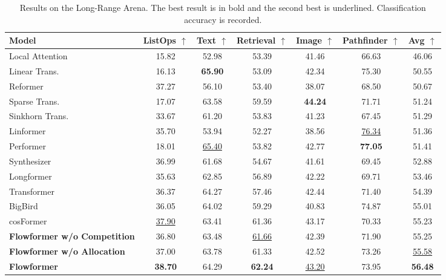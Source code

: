 \documentclass[nohyperref]{article}
\theoremstyle{plain}
\theoremstyle{definition}
\theoremstyle{remark}
\begin{document}
\begin{table*}[h]
	\caption{Results on the Long-Range Arena. The best result is in bold and the second best is underlined. Classification accuracy is recorded.}
	\label{tab:lra}
	\vspace{-5pt}
	\vskip 0.15in
	\centering
	\begin{small}
		\begin{sc}
			\renewcommand{\multirowsetup}{\centering}
			\setlength{\tabcolsep}{4.3pt}
			\begin{tabular}{l|ccccc|c}
				\toprule
				Model & ListOps $\uparrow$ & Text $\uparrow$ & Retrieval $\uparrow$ & Image $\uparrow$ & Pathfinder $\uparrow$ & Avg $\uparrow$ \\
				\midrule
				Local Attention \citep{tay2021long} & 15.82 & 52.98 & 53.39 & 41.46 & 66.63 & 46.06 \\
				Linear Trans. \citep{Katharopoulos2020TransformersAR} & 16.13 & \textbf{65.90} & 53.09 & 42.34 & 75.30 & 50.55 \\
				Reformer \citep{kitaev2020reformer} & 37.27 & 56.10 & 53.40 & 38.07 & 68.50 & 50.67 \\
				Sparse Trans. \citep{Child2019GeneratingLS} & 17.07 & 63.58 & 59.59 & \textbf{44.24} & 71.71 & 51.24 \\
				Sinkhorn Trans. \citep{Tay2020SparseSA} & 33.67 & 61.20 & 53.83 & 41.23 & 67.45 & 51.29 \\
				Linformer \citep{Wang2020LinformerSW} & 35.70 & 53.94 & 52.27 & 38.56 & \underline{76.34} & 51.36 \\
				Performer \citep{performer} & 18.01 & \underline{65.40} & 53.82 & 42.77 & \textbf{77.05} & 51.41 \\
				Synthesizer \citep{Tay2021SynthesizerRS} & 36.99 & 61.68 & 54.67 & 41.61 & 69.45 & 52.88 \\
				Longformer \citep{Beltagy2020LongformerTL} & 35.63 & 62.85 & 56.89 & 42.22 & 69.71 & 53.46 \\
				Transformer \citep{NIPS2017_3f5ee243} & 36.37 & 64.27 & 57.46 & 42.44 & 71.40 & 54.39 \\
				BigBird \citep{Zaheer2020BigBT} & 36.05 & 64.02 & 59.29 & 40.83 & 74.87 & 55.01 \\
				cosFormer \citep{anonymous2022cosformer} & \underline{37.90} & 63.41 & 61.36 & 43.17 & 70.33 & 55.23 \\
				\midrule
				\textbf{Flowformer w/o Competition} & 36.80 & 63.48 & \underline{61.66} & 42.39 & 71.90 & 55.25 \\
				\textbf{Flowformer w/o Allocation} & 37.00 & 63.78 & 61.33 & 42.52 & 73.26 & \underline{55.58} \\
				\textbf{Flowformer} & \textbf{38.70} & 64.29 & \textbf{62.24} & \underline{43.20} & 73.95 & \textbf{56.48} \\
				\bottomrule
			\end{tabular}
		\end{sc}
	\end{small}
    \vspace{-10pt}
\end{table*}
\end{document}
